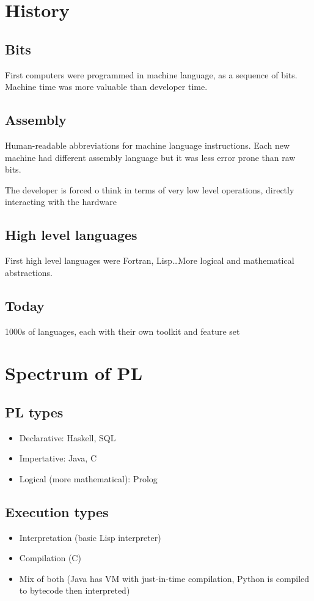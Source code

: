 \documentclass{article}
\begin{document}
\section{History}
\subsection{Bits}
First computers were programmed in machine language, as a sequence of bits. Machine time
was more valuable than developer time.

\subsection{Assembly}
Human-readable abbreviations for machine language instructions. Each new machine had different assembly language
but it was less error prone than raw bits.

The developer is forced o think in terms of very low level operations,
directly interacting with the hardware

\subsection{High level languages}
First high level languages were Fortran, Lisp\dots More logical and mathematical abstractions.

\subsection{Today}
1000s of languages, each with their own toolkit and feature set

\section{Spectrum of PL}
\subsection{PL types}
\begin{itemize}
  \item Declarative: Haskell, SQL
  \item Impertative: Java, C
  \item Logical (more mathematical): Prolog 
\end{itemize}

\subsection{Execution types}
\begin{itemize}
  \item Interpretation (basic Lisp interpreter)
  \item Compilation (C)
  \item Mix of both (Java has VM with just-in-time compilation, Python is compiled to bytecode then interpreted)
\end{itemize}
\end{document}

